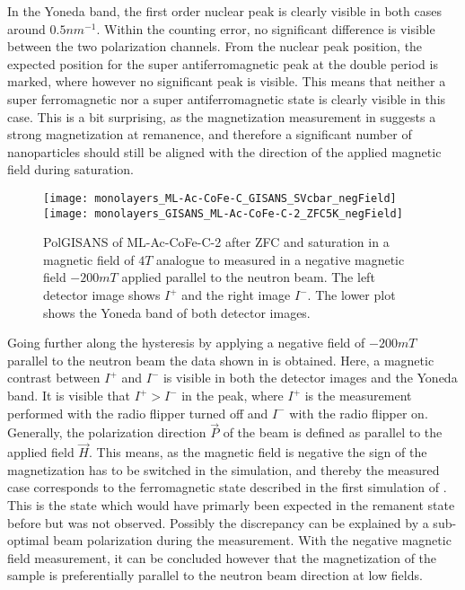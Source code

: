 \documentclass[\main/dresen_thesis.tex]{subfiles}
\begin{document}
  In the Yoneda band, the first order nuclear peak is clearly visible in both cases around $0.5 \unit{nm^{-1}}$.
  Within the counting error, no significant difference is visible between the two polarization channels.
  From the nuclear peak position, the expected position for the super antiferromagnetic peak at the double period is marked, where however no significant peak is visible.
  This means that neither a super ferromagnetic nor a super antiferromagnetic state is clearly visible in this case.
  This is a bit surprising, as the magnetization measurement in  suggests a strong magnetization at remanence, and therefore a significant number of nanoparticles should still be aligned with the direction of the applied magnetic field during saturation.

  \begin{figure}[tb]
    \centering
    \texttt{[image: monolayers\_ML-Ac-CoFe-C\_GISANS\_SVcbar\_negField]}
    \texttt{[image: monolayers\_GISANS\_ML-Ac-CoFe-C-2\_ZFC5K\_negField]}
    \caption{\label{fig:monolayer:magneticStructure:negativeField}PolGISANS of ML-Ac-CoFe-C-2 after ZFC and saturation in a magnetic field of $4 \unit{T}$ analogue to  measured in a negative magnetic field $-200 \unit{mT}$ applied parallel to the neutron beam. The left detector image shows $I^{+}$ and the right image $I^{-}$. The lower plot shows the Yoneda band of both detector images.}
  \end{figure}

  Going further along the hysteresis by applying a negative field of $-200 \unit{mT}$ parallel to the neutron beam the data shown in  is obtained.
  Here, a magnetic contrast between $I^{+}$ and $I^{-}$ is visible in both the detector images and the Yoneda band.
  It is visible that $I^{+} > I^{-}$ in the peak, where $I^{+}$ is the measurement performed with the radio flipper turned off and $I^{-}$ with the radio flipper on.
  Generally, the polarization direction $\vec{P}$ of the beam is defined as parallel to the applied field $\vec{H}$.
  This means, as the magnetic field is negative the sign of the magnetization has to be switched in the simulation, and thereby the measured case corresponds to the ferromagnetic state described in the first simulation of .
  This is the state which would have primarly been expected in the remanent state before but was not observed.
  Possibly the discrepancy can be explained by a sub-optimal beam polarization during the measurement.
  With the negative magnetic field measurement, it can be concluded however that the magnetization of the sample is preferentially parallel to the neutron beam direction at low fields.
\end{document}
